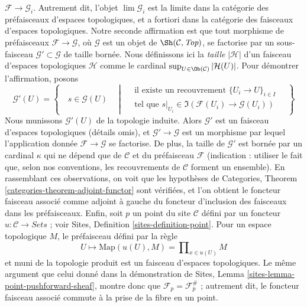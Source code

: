 \begin{remark}
$\mathcal{F} \to \mathcal{G}_i$. Autrement dit, l'objet
$\lim \mathcal{G}_i$ est la limite dans la catégorie
des préfaisceaux d'espaces topologiques, et a fortiori dans la
catégorie des faisceaux d'espaces topologiques.
Notre seconde affirmation est que tout morphisme de préfaisceaux
$\mathcal{F} \to \mathcal{G}$, où $\mathcal{G}$ est un objet de
$\Sh(\mathcal{C}, \textit{Top})$, se factorise par un sous-faisceau
$\mathcal{G}' \subset \mathcal{G}$ de taille bornée.
Nous définissons ici la {\it taille} $|\mathcal{H}|$
d'un faisceau d'espaces topologiques $\mathcal{H}$ comme le cardinal
$\sup_{U \in \Ob(\mathcal{C})} |\mathcal{H}(U)|$.
Pour démontrer l'affirmation, posons
$$
\mathcal{G}'(U) =
\left\{
\quad
s \in \mathcal{G}(U)
\quad \middle| \quad
\begin{matrix}
\text{il existe un recouvrement }\{U_i \to U\}_{i \in I} \\
\text{tel que }
s|_{U_i} \in \Im(\mathcal{F}(U_i) \to \mathcal{G}(U_i))
\end{matrix}
\quad
\right\}
$$
Nous munissons $\mathcal{G}'(U)$ de la topologie induite.
Alors $\mathcal{G}'$ est un faisceau d'espaces topologiques (détails omis),
et $\mathcal{G}' \to \mathcal{G}$ est un morphisme par lequel
l'application donnée $\mathcal{F} \to \mathcal{G}$ se factorise. De plus,
la taille de $\mathcal{G}'$ est bornée par un cardinal
$\kappa$ qui ne dépend que de $\mathcal{C}$ et du préfaisceau $\mathcal{F}$
(indication : utiliser le fait que, selon nos conventions, les recouvrements de $\mathcal{C}$
forment un ensemble). En rassemblant ces observations, on voit
que les hypothèses de Categories, Theorem
\ref{categories-theorem-adjoint-functor}
sont vérifiées, et l'on obtient le foncteur faisceau associé comme adjoint à gauche
du foncteur d'inclusion des faisceaux dans les préfaisceaux.
Enfin, soit $p$ un point du
site $\mathcal{C}$ défini par un foncteur $u : \mathcal{C} \to \textit{Sets}$ ;
voir Sites, Definition \ref{sites-definition-point}.
Pour un espace topologique $M$, le préfaisceau défini par la règle
$$
U \mapsto \text{Map}(u(U), M) = \prod\nolimits_{x \in u(U)} M
$$
et muni de la topologie produit est un faisceau d'espaces topologiques.
Le même argument que celui donné dans la démonstration de
Sites, Lemma \ref{sites-lemma-point-pushforward-sheaf}, montre donc que
$\mathcal{F}_p = \mathcal{F}^\#_p$ ; autrement dit, le foncteur faisceau associé
commute à la prise de la fibre en un point.
\end{remark}




